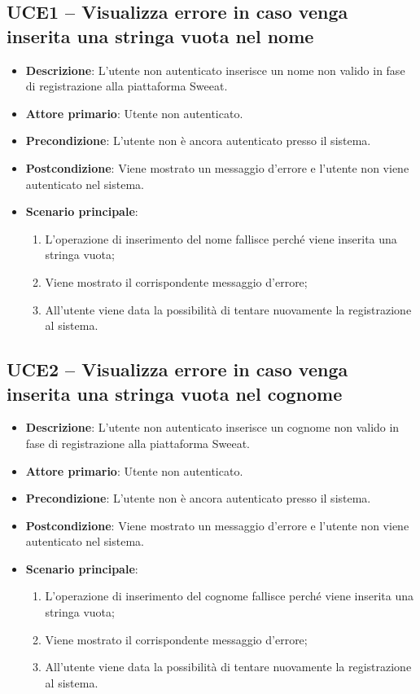 \subsection{UCE1 – Visualizza errore in caso venga inserita una stringa vuota nel nome}
\begin{itemize}
\item \textbf{Descrizione}: L'utente non autenticato inserisce un nome non valido in fase di registrazione alla piattaforma Sweeat.
\item \textbf{Attore primario}: Utente non autenticato.
\item \textbf{Precondizione}: L'utente non è ancora autenticato presso il sistema.
\item \textbf{Postcondizione}: Viene mostrato un messaggio d'errore e l'utente non viene autenticato nel sistema.

\item \textbf{Scenario principale}:
\begin{enumerate}
\item L'operazione di inserimento del nome fallisce perché viene inserita una stringa vuota;
\item Viene mostrato il corrispondente messaggio d'errore;
\item All'utente viene data la possibilità di tentare nuovamente la registrazione al sistema.
\end{enumerate}
\end{itemize}

\subsection{UCE2 – Visualizza errore in caso venga inserita una stringa vuota nel cognome}
\begin{itemize}
\item \textbf{Descrizione}: L'utente non autenticato inserisce un cognome non valido in fase di registrazione alla piattaforma Sweeat.
\item \textbf{Attore primario}: Utente non autenticato.
\item \textbf{Precondizione}: L'utente non è ancora autenticato presso il sistema.
\item \textbf{Postcondizione}: Viene mostrato un messaggio d'errore e l'utente non viene autenticato nel sistema.

\item \textbf{Scenario principale}:
\begin{enumerate}
\item L'operazione di inserimento del cognome fallisce perché viene inserita una stringa vuota;
\item Viene mostrato il corrispondente messaggio d'errore;
\item All'utente viene data la possibilità di tentare nuovamente la registrazione al sistema.
\end{enumerate}
\end{itemize}

